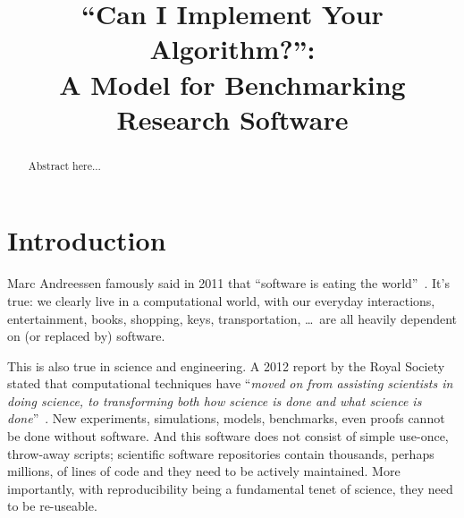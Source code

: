 \documentclass[conference]{IEEEtran}
\begin{document}

\title{``Can I Implement Your Algorithm?'':\\ A Model for Benchmarking Research Software}

\author{
\and
{}
\and
{}
 }

\maketitle

\begin{abstract}
Abstract here...
\end{abstract}

\IEEEpeerreviewmaketitle

\section{Introduction}

Marc Andreessen famously said in 2011 that ``software is eating the
world''~\cite{andreessen:2011}. It's true: we clearly live in a
computational world, with our everyday interactions, entertainment,
books, shopping, keys, transportation, \dots\ are all heavily dependent on (or
replaced by) software.

This is also true in science and engineering. A 2012 report by the
Royal Society stated that computational techniques have ``{\emph{moved
on from assisting scientists in doing science, to transforming both
how science is done and what science is
done}}''~\cite{rssaaoe:2012}. New experiments, simulations, models,
benchmarks, even proofs cannot be done without software. And this
software does not consist of simple use-once, throw-away scripts;
scientific software repositories contain thousands, perhaps millions,
of lines of code and they need to be actively maintained. More
importantly, with reproducibility being a fundamental tenet of
science, they need to be re-useable.
\end{document}
